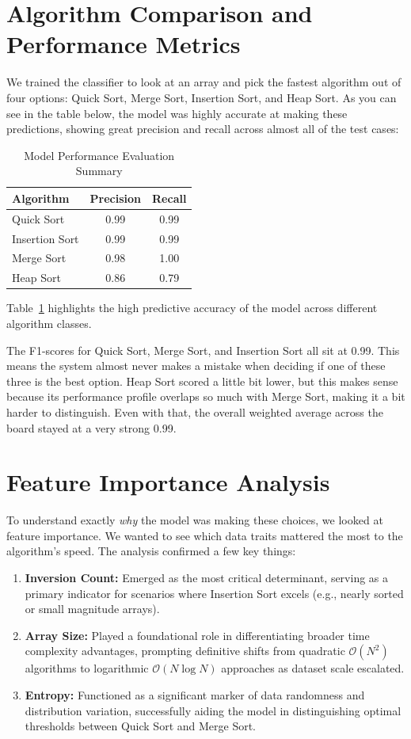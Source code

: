 \documentclass[12pt,a4paper,oneside,openany]{report}
\begin{document}
\section*{Algorithm Comparison and Performance Metrics}
We trained the classifier to look at an array and pick the fastest algorithm out of four options: Quick Sort, Merge Sort, Insertion Sort, and Heap Sort. As you can see in the table below, the model was highly accurate at making these predictions, showing great precision and recall across almost all of the test cases:

\begin{table}[H]
\centering
\begin{tabular}{lcc}
\toprule
\textbf{Algorithm} & \textbf{Precision} & \textbf{Recall} \\
\midrule
Quick Sort & 0.99 & 0.99 \\
Insertion Sort & 0.99 & 0.99 \\
Merge Sort & 0.98 & 1.00 \\
Heap Sort & 0.86 & 0.79 \\
\bottomrule
\end{tabular}
\caption{Model Performance Evaluation Summary}
\label{tab:model}
Table~\ref{tab:model} highlights the high predictive accuracy of the model across different algorithm classes.
\end{table}

The F1-scores for Quick Sort, Merge Sort, and Insertion Sort all sit at 0.99. This means the system almost never makes a mistake when deciding if one of these three is the best option. Heap Sort scored a little bit lower, but this makes sense because its performance profile overlaps so much with Merge Sort, making it a bit harder to distinguish. Even with that, the overall weighted average across the board stayed at a very strong 0.99.

\section*{Feature Importance Analysis}
To understand exactly \textit{why} the model was making these choices, we looked at feature importance. We wanted to see which data traits mattered the most to the algorithm's speed. The analysis confirmed a few key things:
\begin{enumerate}
    \item \textbf{Inversion Count:} Emerged as the most critical determinant, serving as a primary indicator for scenarios where Insertion Sort excels (e.g., nearly sorted or small magnitude arrays).
    \item \textbf{Array Size:} Played a foundational role in differentiating broader time complexity advantages, prompting definitive shifts from quadratic $\mathcal{O}(N^2)$ algorithms to logarithmic $\mathcal{O}(N \log N)$ approaches as dataset scale escalated.
    \item \textbf{Entropy:} Functioned as a significant marker of data randomness and distribution variation, successfully aiding the model in distinguishing optimal thresholds between Quick Sort and Merge Sort.
\end{enumerate}
\end{document}
